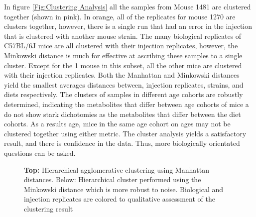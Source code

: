 \documentclass[a4paper,11pt,twoside]{book}
\begin{document}
	In figure \ref{Fig:Clustering Analysis} all the samples from Mouse 1481 are clustered together (shown in pink). In orange, all of the replicates for mouse 1270 are clusters together, however, there is a single run that had an error in the injection that is clustered with another mouse strain.  The many biological replicates of C57BL/6J mice are all clustered with their injection replicates, however, the Minkowski distance is much for effective at ascribing these samples to a single cluster. Except for the 1 mouse in this subset, all the other mice are clustered with their injection replicates. Both the Manhattan and Minkowski distances yield the smallest averages distances between, injection replicates, strains, and diets respectively. The clusters of samples in different age cohorts are robustly determined, indicating the metabolites that differ between age cohorts of mice a do not show stark dichotomies as the metabolites that differ between the diet cohorts. As a results age, mice in the same age cohort on ages may not be clustered together using either metric. The cluster analysis yields a satisfactory result, and there is confidence in the data. Thus, more biologically orientated questions can be asked. 
	
	\begin{figure}[hbt!]
		\caption{ \textbf{Top:} Hierarchical agglomerative clustering using Manhattan distances. Below: Hierarchical cluster performed using the Minkowski distance which is more robust to noise. Biological and injection replicates are colored to qualitative assessment of the clustering result}
		\label{fig:Clustering Analysis}
	\end{figure}
	
\end{document}
